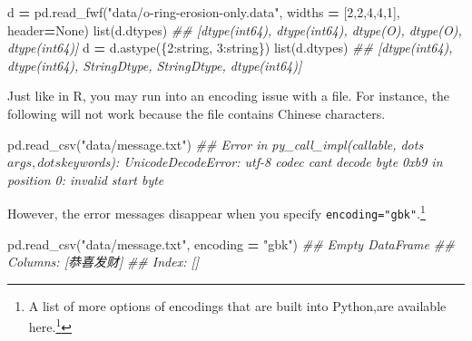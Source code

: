 \documentclass[
  12pt,
  krantz2]{krantz}
\makeatletter
\newenvironment{Shaded}{\begin{snugshade}}{\end{snugshade}}
\newcommand{\BuiltInTok}[1]{#1}
\newcommand{\CommentTok}[1]{\textcolor[rgb]{0.37,0.37,0.37}{\textit{#1}}}
\newcommand{\DecValTok}[1]{\textcolor[rgb]{0.06,0.06,0.06}{#1}}
\newcommand{\NormalTok}[1]{#1}
\newcommand{\OperatorTok}[1]{\textcolor[rgb]{0.43,0.43,0.43}{\textbf{#1}}}
\newcommand{\StringTok}[1]{\textcolor[rgb]{0.5,0.5,0.5}{#1}}
\newcommand{\VariableTok}[1]{\textcolor[rgb]{0,0,0}{#1}}
\renewcommand{\href}[2]{#2\footnote{\url{#1}}}
\newenvironment{kframe}{%
\medskip{}
\setlength{\fboxsep}{.8em}
 \def\at@end@of@kframe{}%
 \ifinner\ifhmode%
  \def\at@end@of@kframe{\end{minipage}}%
  \begin{minipage}{\columnwidth}%
 \fi\fi%
 \def\FrameCommand##1{\hskip\@totalleftmargin \hskip-\fboxsep
 \colorbox{shadecolor}{##1}\hskip-\fboxsep
     \hskip-\linewidth \hskip-\@totalleftmargin \hskip\columnwidth}%
 \MakeFramed {\advance\hsize-\width
   \@totalleftmargin\z@ \linewidth\hsize
   \@setminipage}}%
 {\par\unskip\endMakeFramed%
 \at@end@of@kframe}
\renewenvironment{Shaded}{\begin{kframe}}{\end{kframe}}
\makeatother
\begin{document}
\begin{Shaded}
\begin{Highlighting}[]
\NormalTok{d }\OperatorTok{=}\NormalTok{ pd.read\_fwf(}\StringTok{"data/o{-}ring{-}erosion{-}only.data"}\NormalTok{, }
\NormalTok{                widths }\OperatorTok{=}\NormalTok{ [}\DecValTok{2}\NormalTok{,}\DecValTok{2}\NormalTok{,}\DecValTok{4}\NormalTok{,}\DecValTok{4}\NormalTok{,}\DecValTok{1}\NormalTok{], header}\OperatorTok{=}\VariableTok{None}\NormalTok{)}
\BuiltInTok{list}\NormalTok{(d.dtypes)}
\CommentTok{\#\# [dtype(\textquotesingle{}int64\textquotesingle{}), dtype(\textquotesingle{}int64\textquotesingle{}), dtype(\textquotesingle{}O\textquotesingle{}), dtype(\textquotesingle{}O\textquotesingle{}), dtype(\textquotesingle{}int64\textquotesingle{})]}
\NormalTok{d }\OperatorTok{=}\NormalTok{ d.astype(\{}\DecValTok{2}\NormalTok{:}\StringTok{\textquotesingle{}string\textquotesingle{}}\NormalTok{, }\DecValTok{3}\NormalTok{:}\StringTok{\textquotesingle{}string\textquotesingle{}}\NormalTok{\}) }
\BuiltInTok{list}\NormalTok{(d.dtypes)}
\CommentTok{\#\# [dtype(\textquotesingle{}int64\textquotesingle{}), dtype(\textquotesingle{}int64\textquotesingle{}), StringDtype, StringDtype, dtype(\textquotesingle{}int64\textquotesingle{})]}
\end{Highlighting}
\end{Shaded}

Just like in R, you may run into an encoding issue with a file. For instance, the following will not work because the file contains Chinese characters.

\begin{Shaded}
\begin{Highlighting}[]
\NormalTok{pd.read\_csv(}\StringTok{"data/message.txt"}\NormalTok{)}
\CommentTok{\#\# Error in py\_call\_impl(callable, dots$args, dots$keywords): UnicodeDecodeError: \textquotesingle{}utf{-}8\textquotesingle{} codec can\textquotesingle{}t decode byte 0xb9 in position 0: invalid start byte}
\end{Highlighting}
\end{Shaded}

However, the error messages disappear when you specify \texttt{encoding="gbk"}.\footnote{A list of more options of encodings that are built into Python,are available \href{https://docs.python.org/3/library/codecs.html\#standard-encodings}{here.}}

\begin{Shaded}
\begin{Highlighting}[]
\NormalTok{pd.read\_csv(}\StringTok{"data/message.txt"}\NormalTok{, encoding }\OperatorTok{=} \StringTok{"gbk"}\NormalTok{)}
\CommentTok{\#\# Empty DataFrame}
\CommentTok{\#\# Columns: [恭喜发财]}
\CommentTok{\#\# Index: []}
\end{Highlighting}
\end{Shaded}
\end{document}
